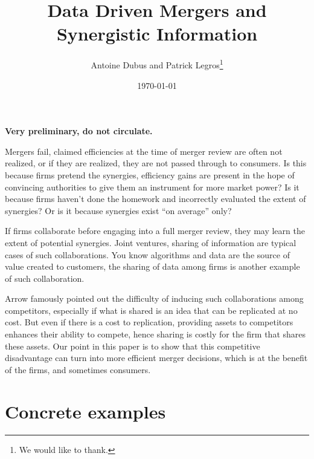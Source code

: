 \documentclass[a4paper,leqno]{article}%
\begin{document}
\title{Data Driven Mergers and Synergistic Information}
\author{Antoine Dubus and Patrick Legros\thanks{We would like to thank.}}
\date{\today}


\maketitle

 
\textbf{Very preliminary, do not circulate.}

\baselineskip0.7cm
Mergers fail, claimed efficiencies at the time of merger review are often not realized, or if they are realized, they are not passed through to consumers. Is this because firms pretend the synergies, efficiency gains are present in the hope of convincing authorities to give them an instrument for more market power? Is it because firms haven't done the homework and incorrectly evaluated the extent of synergies? Or is it because synergies exist ``on average'' only?

If firms collaborate before engaging into a full merger review, they may learn the extent of potential synergies. Joint ventures, sharing of information are typical cases of such collaborations. You know algorithms and data are the source of value created to customers, the sharing of data among firms is another example of such collaboration.

Arrow famously pointed out the difficulty of inducing such collaborations among competitors, especially if what is shared is an idea that can be replicated at no cost. But even if there is a cost to replication, providing assets to competitors enhances their ability to compete, hence sharing is costly for the firm that shares these assets. Our point in this paper is to show that this competitive disadvantage can turn into more efficient merger decisions, which is at the benefit of the firms, and sometimes consumers.


\section{Concrete examples}
\end{document}
